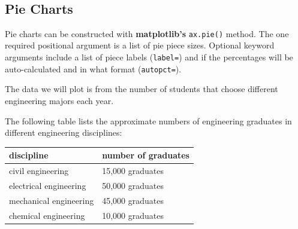 \documentclass{book}
\begin{document}
    \begin{center}
    \end{center}
    { \hspace*{\fill} \\}
    

    
        \subsection{Pie Charts}\label{pie-charts}
    




    
        Pie charts can be constructed with \textbf{matplotlib's}
\lstinline!ax.pie()! method. The one required positional argument is a
list of pie piece sizes. Optional keyword arguments include a list of
piece labels (\lstinline!label=!) and if the percentages will be
auto-calculated and in what format (\lstinline!autopct=!).

The data we will plot is from the number of students that choose
different engineering majors each year.

The following table lists the approximate numbers of engineering
graduates in different engineering disciplines:

\begin{longtable}[]{@{}ll@{}}
\toprule
discipline & number of graduates\tabularnewline
\midrule
\endhead
civil engineering & 15,000 graduates\tabularnewline
electrical engineering & 50,000 graduates\tabularnewline
mechanical engineering & 45,000 graduates\tabularnewline
chemical engineering & 10,000 graduates\tabularnewline
\bottomrule
\end{longtable}
    
\end{document}
